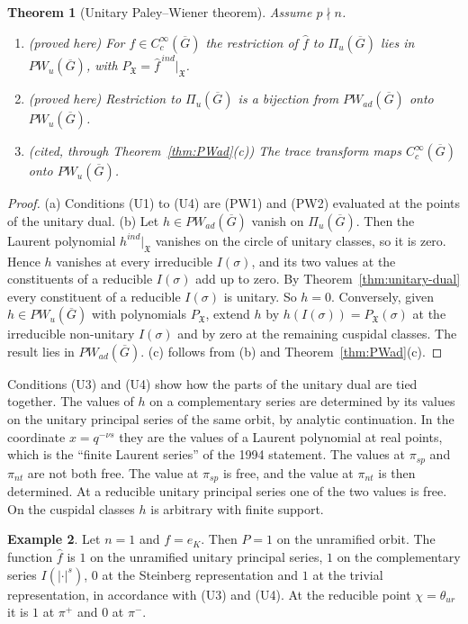 \documentclass[12pt,letterpaper]{article}
\numberwithin{equation}{section}
\newtheorem{theorem}{Theorem}[section]
\theoremstyle{definition}
\newtheorem{xexample}[theorem]{Example}
\newcommand{\proved}{proved here}
\newcommand{\cited}{cited}
\newcommand{\bG}{\overline{G}}
\newcommand{\fX}{\mathfrak X}
\newcommand{\Piu}{\Pi_{u}(\bG)}
\begin{document}
\begin{theorem}[Unitary Paley--Wiener theorem]\label{thm:PWu}
Assume $p\nmid n$.
\begin{enumerate}[label=(\alph*),leftmargin=*,itemsep=1pt]
\item (\proved) For $f\in C_c^\infty(\bG)$ the restriction of $\hat f$ to $\Piu$ lies in
$PW_u(\bG)$, with $P_{\fX}=\hat f^{\,ind}|_{\fX}$.
\item (\proved) Restriction to $\Piu$ is a bijection from $PW_{ad}(\bG)$ onto $PW_u(\bG)$.
\item (\cited, through Theorem~\ref{thm:PWad}(c)) The trace transform maps
$C_c^\infty(\bG)$ onto $PW_u(\bG)$.
\end{enumerate}
\end{theorem}
\begin{proof}
(a) Conditions (U1) to (U4) are (PW1) and (PW2) evaluated at the points of the unitary
dual.  (b) Let $h\in PW_{ad}(\bG)$ vanish on $\Piu$.  Then the Laurent polynomial
$h^{ind}|_{\fX}$ vanishes on the circle of unitary classes, so it is zero.  Hence $h$
vanishes at every irreducible $I(\sigma)$, and its two values at the constituents of a
reducible $I(\sigma)$ add up to zero.  By Theorem~\ref{thm:unitary-dual} every constituent
of a reducible $I(\sigma)$ is unitary.  So $h=0$.  Conversely, given $h\in PW_u(\bG)$ with
polynomials $P_{\fX}$, extend $h$ by $h(I(\sigma))=P_{\fX}(\sigma)$ at the irreducible
non-unitary $I(\sigma)$ and by zero at the remaining cuspidal classes.  The result lies in
$PW_{ad}(\bG)$.  (c) follows from (b) and Theorem~\ref{thm:PWad}(c).
\end{proof}

Conditions (U3) and (U4) show how the parts of the unitary dual are tied together.  The
values of $h$ on a complementary series are determined by its values on the unitary
principal series of the same orbit, by analytic continuation.  In the coordinate
$x=q^{-\nu s}$ they are the values of a Laurent polynomial at real points, which is the
``finite Laurent series'' of the 1994 statement.  The values at $\pi_{sp}$ and $\pi_{nt}$
are not both free.  The value at $\pi_{sp}$ is free, and the value at $\pi_{nt}$ is then
determined.  At a reducible unitary principal series one of the two values is free.  On
the cuspidal classes $h$ is arbitrary with finite support.

\begin{xexample}\label{ex:PWu}
Let $n=1$ and $f=e_K$.  Then $P=1$ on the unramified orbit.  The function $\hat f$ is $1$
on the unramified unitary principal series, $1$ on the complementary series $I(|\cdot|^s)$,
$0$ at the Steinberg representation and $1$ at the trivial representation, in accordance
with (U3) and (U4).  At the reducible point $\chi=\theta_{ur}$ it is $1$ at $\pi^+$ and
$0$ at $\pi^-$.
\end{xexample}
\end{document}
